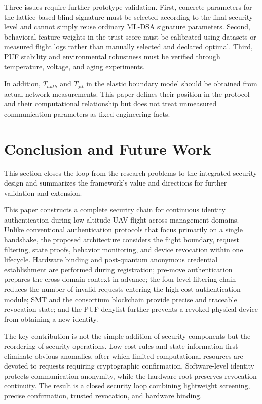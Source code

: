 \documentclass[lettersize,journal]{IEEEtran}
\begin{document}
	Three issues require further prototype validation. First, concrete parameters for the lattice-based blind signature must be selected according to the final security level and cannot simply reuse ordinary ML-DSA signature parameters. Second, behavioral-feature weights in the trust score must be calibrated using datasets or measured flight logs rather than manually selected and declared optimal. Third, PUF stability and environmental robustness must be verified through temperature, voltage, and aging experiments.
	
	In addition, $T_{auth}$ and $T_{jit}$ in the elastic boundary model should be obtained from actual network measurements. This paper defines their position in the protocol and their computational relationship but does not treat unmeasured communication parameters as fixed engineering facts.
	
	\section{Conclusion and Future Work}
	This section closes the loop from the research problems to the integrated security design and summarizes the framework's value and directions for further validation and extension.
	
	
	This paper constructs a complete security chain for continuous identity authentication during low-altitude UAV flight across management domains. Unlike conventional authentication protocols that focus primarily on a single handshake, the proposed architecture considers the flight boundary, request filtering, state proofs, behavior monitoring, and device revocation within one lifecycle. Hardware binding and post-quantum anonymous credential establishment are performed during registration; pre-move authentication prepares the cross-domain context in advance; the four-level filtering chain reduces the number of invalid requests entering the high-cost authentication module; SMT and the consortium blockchain provide precise and traceable revocation state; and the PUF denylist further prevents a revoked physical device from obtaining a new identity.
	
	The key contribution is not the simple addition of security components but the reordering of security operations. Low-cost rules and state information first eliminate obvious anomalies, after which limited computational resources are devoted to requests requiring cryptographic confirmation. Software-level identity protects communication anonymity, while the hardware root preserves revocation continuity. The result is a closed security loop combining lightweight screening, precise confirmation, trusted revocation, and hardware binding.
	
\end{document}
